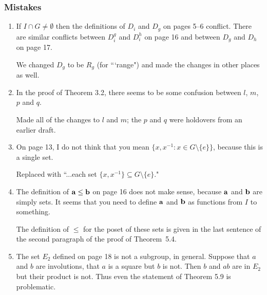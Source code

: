 \documentclass[12pt,a4paper]{article}
\newenvironment{QandA}{\begin{enumerate}[label=\bfseries\alph*.]\bfseries}
                      {\end{enumerate}}
\newenvironment{answered}{\par\normalfont}{}
\begin{document}
\subsubsection*{Mistakes}

\begin{QandA}

\item If $I \cap G \neq \emptyset$ then the definitions of $D_i$ and $D_g$ on pages 5--6 conflict.  There are similar conflicts between $D_i^g$ and $D_i^h$ on page 16 and between $D_g$ and $D_h$ on page 17. 

\begin{answered}
We changed $D_g$ to be $R_g$ (for ```range") and made the changes in other places as well.
\end{answered}


\item  In the proof of Theorem 3.2, there seems to be some confusion between $l$, $m$, $p$ and $q$. 

\begin{answered}
Made all of the changes to $l$ and $m$; the $p$ and $q$ were holdovers from an earlier draft.
\end{answered}


\item On page 13, I do not think that you mean $\{x,x^{-1} : x \in G \setminus \{e\} \}$, because this is a single set.

\begin{answered}
Replaced with ``...each set $\{ x,x^{-1} \} \subseteq G\setminus \{e\}$."
\end{answered}

\item The definition of ${\bf a} \leq {\bf b}$ on page 16 does not make sense, because ${\bf a}$ and ${\bf  b}$ are simply sets.  It seems that you need to define ${\bf a}$ and ${\bf b}$ as functions from $I$ to something.

\begin{answered} 
The definition of $\leq$ for the poset of  these sets is given in the last sentence of the second paragraph of the proof of Theorem~5.4.
\end{answered}


\item The set $E_2$ defined on page 18 is not a subgroup, in general. Suppose that $a$ and $b$ are involutions, that $a$ is a square but $b$ is not. Then $b$ and $ab$ are in $E_2$ but their product is not. Thus even the statement of Theorem 5.9 is problematic.


\end{QandA}
\end{document}
